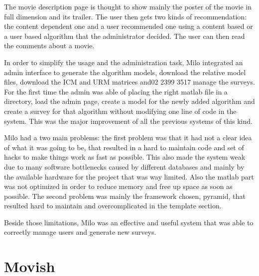 The movie description page is thought to show mainly the poster of the movie in full dimension and its trailer. The user then gets two kinds of recommendation: the content dependent one and a user recommended one using a content based or a user based algorithm that the administrator decided. The user can then read the comments about a movie.

In order to simplify the usage and the administration task, Milo integrated an admin interface to generate the algorithm models, download the relative model files, download the \ac{ICM} and \ac{URM} matrices and02 2399 3517 manage the surveys. For the first time the admin was able of placing the right matlab file in a directory, load the admin page, create a model for the newly added algorithm and create a survey for that algorithm without modifying one line of code in the system. This was the major improvement of all the previous systems of this kind.

Milo had a two main problems: the first problem was that it had not a clear idea of what it was going to be, that resulted in a hard to maintain code and set of hacks to make things work as fast as possible. This also made the system weak due to many software bottlenecks caused by different databases and mainly by the available hardware for the project that was way limited. Also the matlab part was not optimized in order to reduce memory and free up space as soon as possible. The second problem was mainly the framework chosen, pyramid, that resulted hard to maintain and overcomplicated in the template section.

Beside those limitations, Milo was an effective and useful system that was able to correctly manage users and generate new surveys.

\section{Movish}
\label{sec:movish}

